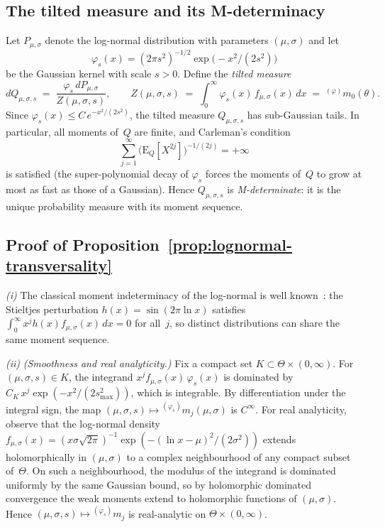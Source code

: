 \documentclass[11pt,a4paper]{article}
\newcommand{\E}{\mathrm{E}}
\newcommand{\wm}[1]{{}^{(\varphi)}\!m_{#1}}
\begin{document}
\subsection*{The tilted measure and its M-determinacy}

Let $P_{\mu,\sigma}$ denote the log-normal distribution with
parameters $(\mu,\sigma)$ and let
\[
\varphi_s(x) = (2\pi s^2)^{-1/2}\exp\bigl(-x^2/(2s^2)\bigr)
\]
be the Gaussian kernel with scale $s>0$.  Define the \emph{tilted measure}
\begin{equation}\label{eq:tilted}
  dQ_{\mu,\sigma,s} \;=\;
  \frac{\varphi_s\, dP_{\mu,\sigma}}{Z(\mu,\sigma,s)},
  \qquad
  Z(\mu,\sigma,s) \;=\;
  \int_0^\infty \varphi_s(x)\, f_{\mu,\sigma}(x)\, dx
  \;=\; \wm{0}(\theta).
\end{equation}
Since $\varphi_s(x) \leq C\,e^{-x^2/(2s^2)}$, the tilted measure
$Q_{\mu,\sigma,s}$ has sub-Gaussian tails.  In particular, all moments
of~$Q$ are finite, and Carleman's condition
\[
  \sum_{j=1}^{\infty}
  \bigl(\E_Q[X^{2j}]\bigr)^{-1/(2j)} = +\infty
\]
is satisfied (the super-polynomial decay of $\varphi_s$ forces the
moments of~$Q$ to grow at most as fast as those of a Gaussian).  Hence
$Q_{\mu,\sigma,s}$ is \emph{M-determinate}: it is the unique
probability measure with its moment sequence.

\subsection*{Proof of
  Proposition~\ref{prop:lognormal-transversality}}

\emph{(i)} The classical moment indeterminacy of the log-normal is
well known~\cite{Stoyanov2000}: the Stieltjes perturbation
$h(x) = \sin(2\pi\ln x)$ satisfies $\int_0^\infty x^j h(x)
f_{\mu,\sigma}(x)\,dx = 0$ for all~$j$, so distinct distributions
can share the same moment sequence.

\emph{(ii)} \emph{(Smoothness and real analyticity.)}
Fix a compact set $K \subset \Theta \times (0,\infty)$.  For
$(\mu,\sigma,s) \in K$, the integrand
$x^j f_{\mu,\sigma}(x)\,\varphi_s(x)$ is dominated by
$C_K\, x^j \exp(-x^2/(2s_{\max}^2))$, which is integrable.  By
differentiation under the integral sign, the map
$(\mu,\sigma,s) \mapsto {}^{(\varphi_s)}\!m_j(\mu,\sigma)$ is
$C^\infty$.  For real analyticity, observe that the log-normal density
$f_{\mu,\sigma}(x) = (x\sigma\sqrt{2\pi})^{-1}\exp(-(\ln x -
\mu)^2/(2\sigma^2))$ extends holomorphically in $(\mu,\sigma)$ to a
complex neighbourhood of any compact subset of~$\Theta$.  On such a
neighbourhood, the modulus of the integrand is dominated uniformly by
the same Gaussian bound, so by holomorphic dominated convergence the
weak moments extend to holomorphic functions of $(\mu,\sigma)$.
Hence $(\mu,\sigma,s) \mapsto {}^{(\varphi_s)}\!m_j$ is real-analytic
on $\Theta \times (0,\infty)$.
\end{document}
